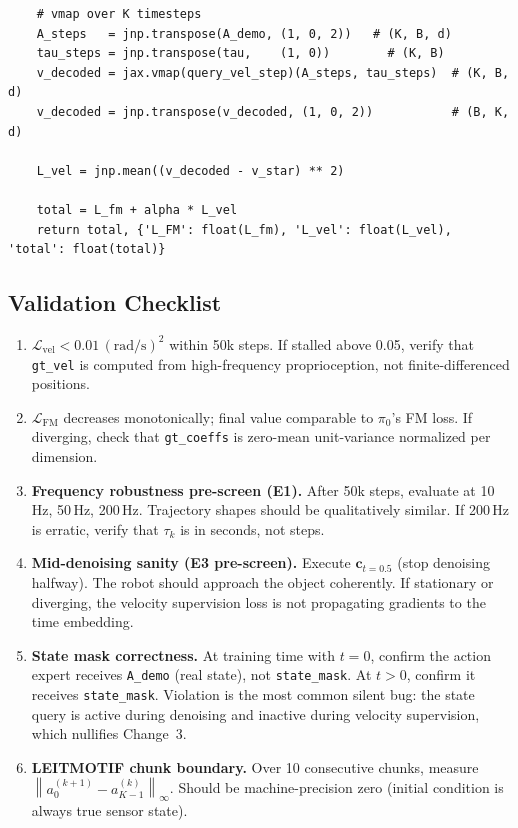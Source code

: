 \documentclass[11pt]{article}
\theoremstyle{plain}
\theoremstyle{definition}
\newcommand{\cL}{\mathcal{L}}
\newcommand{\norm}[1]{\left\lVert#1\right\rVert}
\newcommand{\tdiff}{t}
\newcommand{\texec}{\tau}
\newcommand{\ccoeff}{\mathbf{c}}
\begin{document}
\begin{verbatim}
    # vmap over K timesteps
    A_steps   = jnp.transpose(A_demo, (1, 0, 2))   # (K, B, d)
    tau_steps = jnp.transpose(tau,    (1, 0))        # (K, B)
    v_decoded = jax.vmap(query_vel_step)(A_steps, tau_steps)  # (K, B, d)
    v_decoded = jnp.transpose(v_decoded, (1, 0, 2))           # (B, K, d)

    L_vel = jnp.mean((v_decoded - v_star) ** 2)

    total = L_fm + alpha * L_vel
    return total, {'L_FM': float(L_fm), 'L_vel': float(L_vel), 'total': float(total)}
\end{verbatim}

\subsection{Validation Checklist}

\begin{enumerate}[leftmargin=2em,label=\textbf{V\arabic*.}]
  \item $\cL_{\mathrm{vel}} < 0.01\,(\text{rad/s})^2$ within 50k steps.
    If stalled above 0.05, verify that \texttt{gt\_vel} is computed from
    high-frequency proprioception, not finite-differenced positions.

  \item $\cL_{\mathrm{FM}}$ decreases monotonically; final value comparable
    to $\pi_0$'s FM loss.
    If diverging, check that \texttt{gt\_coeffs} is zero-mean unit-variance
    normalized per dimension.

  \item \textbf{Frequency robustness pre-screen (E1).}
    After 50k steps, evaluate at 10\,Hz, 50\,Hz, 200\,Hz.
    Trajectory shapes should be qualitatively similar.
    If 200\,Hz is erratic, verify that $\texec_k$ is in seconds, not steps.

  \item \textbf{Mid-denoising sanity (E3 pre-screen).}
    Execute $\ccoeff_{t=0.5}$ (stop denoising halfway).
    The robot should approach the object coherently.
    If stationary or diverging, the velocity supervision loss is not
    propagating gradients to the time embedding.

  \item \textbf{State mask correctness.}
    At training time with $\tdiff = 0$, confirm the action expert receives
    \texttt{A\_demo} (real state), not \texttt{state\_mask}.
    At $\tdiff > 0$, confirm it receives \texttt{state\_mask}.
    Violation is the most common silent bug: the state query is active
    during denoising and inactive during velocity supervision,
    which nullifies Change~3.

  \item \textbf{LEITMOTIF chunk boundary.}
    Over 10 consecutive chunks, measure
    $\norm{a_0^{(k+1)} - a_{K-1}^{(k)}}_\infty$.
    Should be machine-precision zero (initial condition is always true sensor state).
\end{enumerate}
\end{document}
